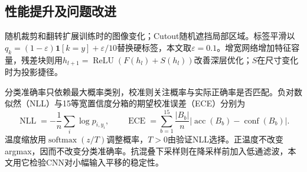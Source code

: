 \subsection{性能提升及问题改进}
随机裁剪和翻转扩展训练时的图像变化；Cutout随机遮挡局部区域\cite{devries2017cutout}。标签平滑以$q_k=(1-\varepsilon)\mathbf1[k=y]+\varepsilon/10$替换硬标签，本文取$\varepsilon=0.1$\cite{szegedy2016rethinking}。增宽网络增加特征容量，残差块则用$h_{l+1}=\operatorname{ReLU}(F(h_l)+S(h_l))$改善深层优化；$S$在尺寸变化时为投影捷径\cite{he2016resnet}。

分类准确率只依赖最大概率类别，校准则关注概率与实际正确率是否匹配。负对数似然（NLL）与15等宽置信度分箱的期望校准误差（ECE）分别为
\begin{equation}
 \operatorname{NLL}=-\frac1n\sum_i\log p_{i,y_i},\qquad
 \operatorname{ECE}=\sum_{b=1}^{15}\frac{|B_b|}{n}|\operatorname{acc}(B_b)-\operatorname{conf}(B_b)|.
\end{equation}
温度缩放用$\operatorname{softmax}(z/T)$调整概率，$T>0$由验证NLL选择\cite{guo2017calibration}。正温度不改变argmax，因而不改变分类准确率。抗混叠下采样则在降采样前加入低通滤波\cite{zhang2019shift}，本文用它检验CNN对小幅输入平移的稳定性。
